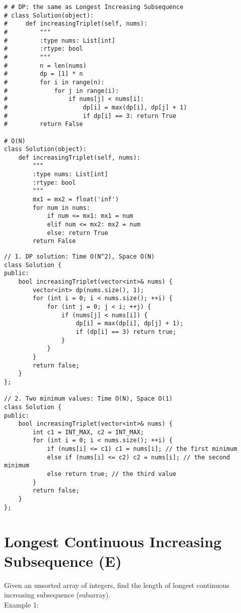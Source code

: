 \begin{lstlisting}
# # DP: the same as Longest Increasing Subsequence
# class Solution(object):
#     def increasingTriplet(self, nums):
#         """
#         :type nums: List[int]
#         :rtype: bool
#         """
#         n = len(nums)
#         dp = [1] * n
#         for i in range(n):
#             for j in range(i):
#                 if nums[j] < nums[i]:
#                     dp[i] = max(dp[i], dp[j] + 1)
#                     if dp[i] == 3: return True
#         return False

# O(N)
class Solution(object):
    def increasingTriplet(self, nums):
        """
        :type nums: List[int]
        :rtype: bool
        """
        mx1 = mx2 = float('inf')
        for num in nums:
            if num <= mx1: mx1 = num
            elif num <= mx2: mx2 = num
            else: return True
        return False
\end{lstlisting}

\begin{lstlisting}
// 1. DP solution: Time O(N^2), Space O(N)
class Solution {
public:
    bool increasingTriplet(vector<int>& nums) {
        vector<int> dp(nums.size(), 1);
        for (int i = 0; i < nums.size(); ++i) {
            for (int j = 0; j < i; ++j) {
                if (nums[j] < nums[i]) {
                    dp[i] = max(dp[i], dp[j] + 1);
                    if (dp[i] == 3) return true;
                }
            }
        }
        return false;
    }
};

// 2. Two minimum values: Time O(N), Space O(1)
class Solution {
public:
    bool increasingTriplet(vector<int>& nums) {
        int c1 = INT_MAX, c2 = INT_MAX;
        for (int i = 0; i < nums.size(); ++i) {
            if (nums[i] <= c1) c1 = nums[i]; // the first minimum
            else if (nums[i] <= c2) c2 = nums[i]; // the second minimum
            else return true; // the third value
        }
        return false;
    }
};
\end{lstlisting}

\section{Longest Continuous Increasing Subsequence (E)}
 Given an unsorted array of integers, find the length of longest continuous increasing subsequence (subarray).\\

Example 1:\\

